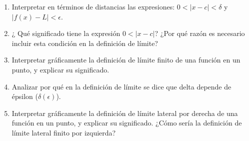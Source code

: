 \documentclass[12pt]{article}
\newtheorem*{myteo}{Teorema} %
\theoremstyle{definition}
\newtheorem*{mydef}{Definición}
\begin{document}
\begin{enumerate}

\item Interpretar en términos de distancias las expresiones: $0 < |x - c| < \delta$ y $|f(x) - L| < \epsilon$.

\item ¿ Qué significado tiene la expresión $0 < |x - c|$? ¿Por qué razón es necesario incluir esta condición en la definición de límite?

\item Interpretar gráficamente la definición de límite finito de una función en un punto, y explicar su significado.
 
\item Analizar por qué en la definición de límite se dice que delta depende de épsilon ($\delta\left(\epsilon\right)$).


\item Interpretar gráficamente la definición de límite lateral por derecha de una función en un punto, y explicar su significado. ¿Cómo sería la definición de límite lateral finito por izquierda?

\end{enumerate}
\end{document}
